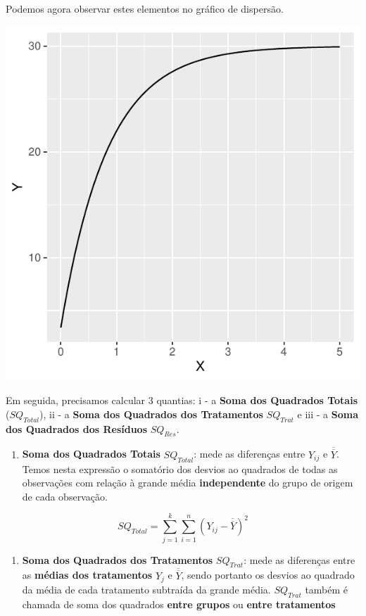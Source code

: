\documentclass[
]{book}
\providecommand{\tightlist}{%
  \setlength{\itemsep}{0pt}\setlength{\parskip}{0pt}}
\begin{document}
Podemos agora observar estes elementos no gráfico de dispersão.

\includegraphics{probest-cambientais_files/figure-latex/unnamed-chunk-226-1.pdf}

Em seguida, precisamos calcular \(3\) quantias: i - a \textbf{Soma dos Quadrados Totais} (\(SQ_{Total}\)), ii - a \textbf{Soma dos Quadrados dos Tratamentos} \(SQ_{Trat}\) e iii - a \textbf{Soma dos Quadrados dos Resíduos} \(SQ_{Res}\).

\begin{enumerate}
\def\labelenumi{\roman{enumi}.}
\tightlist
\item
  \textbf{Soma dos Quadrados Totais} \(SQ_{Total}\): mede as diferenças entre \(Y_{ij}\) e \(\overline{\overline{Y}}\). Temos nesta expressão o somatório dos desvios ao quadrados de todas as observações com relação à grande média \textbf{independente} do grupo de origem de cada observação.
\end{enumerate}

\[SQ_{Total} = \sum_{j = 1}^{k}\sum_{i = 1}^{n}(Y_{ij} - \overline{\overline{Y}})^2\]

\begin{enumerate}
\def\labelenumi{\roman{enumi}.}
\setcounter{enumi}{1}
\tightlist
\item
  \textbf{Soma dos Quadrados dos Tratamentos} \(SQ_{Trat}\): mede as diferenças entre as \textbf{médias dos tratamentos} \(Y_j\) e \(\overline{\overline{Y}}\), sendo portanto os desvios ao quadrado da média de cada tratamento subtraída da grande média. \(SQ_{Trat}\) também é chamada de soma dos quadrados \textbf{entre grupos} ou \textbf{entre tratamentos}
\end{enumerate}
\end{document}

